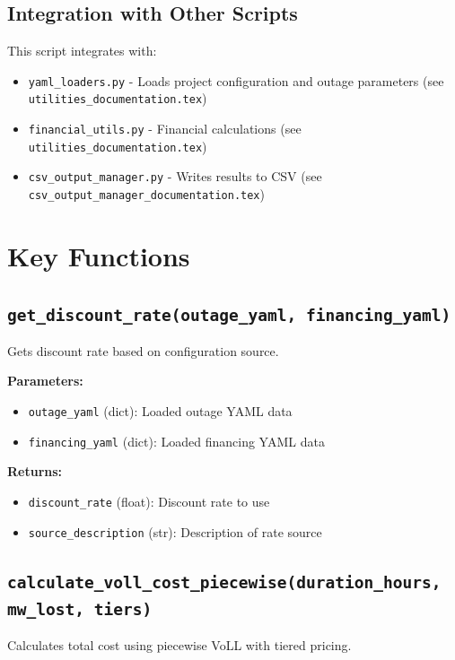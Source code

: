 \documentclass[12pt]{article}
\begin{document}
\subsection{Integration with Other Scripts}

This script integrates with:
\begin{itemize}
    \item \texttt{yaml\_loaders.py} - Loads project configuration and outage parameters (see \texttt{utilities\_documentation.tex})
    \item \texttt{financial\_utils.py} - Financial calculations (see \texttt{utilities\_documentation.tex})
    \item \texttt{csv\_output\_manager.py} - Writes results to CSV (see \texttt{csv\_output\_manager\_documentation.tex})
\end{itemize}

\section{Key Functions}

\subsection{\texttt{get\_discount\_rate(outage\_yaml, financing\_yaml)}}

Gets discount rate based on configuration source.

\textbf{Parameters:}
\begin{itemize}
    \item \texttt{outage\_yaml} (dict): Loaded outage YAML data
    \item \texttt{financing\_yaml} (dict): Loaded financing YAML data
\end{itemize}

\textbf{Returns:}
\begin{itemize}
    \item \texttt{discount\_rate} (float): Discount rate to use
    \item \texttt{source\_description} (str): Description of rate source
\end{itemize}

\subsection{\texttt{calculate\_voll\_cost\_piecewise(duration\_hours, mw\_lost, tiers)}}

Calculates total cost using piecewise VoLL with tiered pricing.
\end{document}
